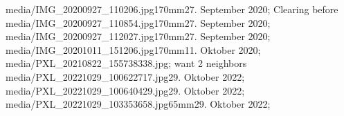 \clearpage  %
\photoNouveauN
  {media/IMG_20200927_110206.jpg}{170mm}{27. September 2020; Clearing before}
  {}{}{}
\photoNouveauN
  {media/IMG_20200927_110854.jpg}{170mm}{27. September 2020; }
  {}{}{}
\clearpage  %
\photoNouveauN
  {media/IMG_20200927_112027.jpg}{170mm}{27. September 2020; }
  {}{}{}
\photoNouveauN
  {media/IMG_20201011_151206.jpg}{170mm}{11. Oktober 2020; }
  {}{}{}
\clearpage  %
\photoNouveauM{170mm}
  {media/PXL_20210822_155738338.jpg}{; want 2 neighbors}
  {media/PXL_20221029_100622717.jpg}{29. Oktober 2022; }
  {media/PXL_20221029_100640429.jpg}{29. Oktober 2022; }
\photoNouveauN
  {media/PXL_20221029_103353658.jpg}{65mm}{29. Oktober 2022; }
